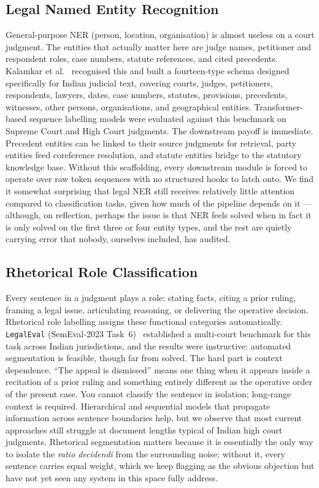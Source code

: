 \subsection{Legal Named Entity Recognition}

General-purpose NER (person, location, organisation) is almost useless on a court judgment. The entities that actually matter here are judge names, petitioner and respondent roles, case numbers, statute references, and cited precedents. Kalamkar et al.~\cite{kalamkar-etal-2022-ner} recognised this and built a fourteen-type schema designed specifically for Indian judicial text, covering courts, judges, petitioners, respondents, lawyers, dates, case numbers, statutes, provisions, precedents, witnesses, other persons, organisations, and geographical entities. Transformer-based sequence labelling models were evaluated against this benchmark on Supreme Court and High Court judgments. The downstream payoff is immediate. Precedent entities can be linked to their source judgments for retrieval, party entities feed coreference resolution, and statute entities bridge to the statutory knowledge base. Without this scaffolding, every downstream module is forced to operate over raw token sequences with no structured hooks to latch onto. We find it somewhat surprising that legal NER still receives relatively little attention compared to classification tasks, given how much of the pipeline depends on it — although, on reflection, perhaps the issue is that NER feels solved when in fact it is only solved on the first three or four entity types, and the rest are quietly carrying error that nobody, ourselves included, has audited.

\subsection{Rhetorical Role Classification}

Every sentence in a judgment plays a role: stating facts, citing a prior ruling, framing a legal issue, articulating reasoning, or delivering the operative decision. Rhetorical role labelling assigns these functional categories automatically. \texttt{LegalEval} (SemEval-2023 Task~6)~\cite{modi-etal-2023-semeval} established a multi-court benchmark for this task across Indian jurisdictions, and the results were instructive: automated segmentation is feasible, though far from solved. The hard part is context dependence. ``The appeal is dismissed'' means one thing when it appears inside a recitation of a prior ruling and something entirely different as the operative order of the present case. You cannot classify the sentence in isolation; long-range context is required. Hierarchical and sequential models that propagate information across sentence boundaries help, but we observe that most current approaches still struggle at document lengths typical of Indian high court judgments. Rhetorical segmentation matters because it is essentially the only way to isolate the \emph{ratio decidendi} from the surrounding noise; without it, every sentence carries equal weight, which we keep flagging as the obvious objection but have not yet seen any system in this space fully address.

